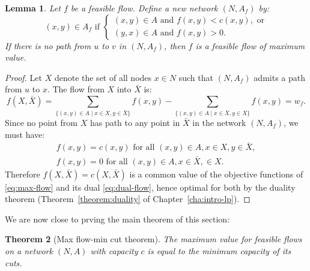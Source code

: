 \documentclass{amsbook}
\newtheorem{theorem}{Theorem}[section]
\newtheorem{lemma}[theorem]{Lemma}
\theoremstyle{definition}
\theoremstyle{remark}
\begin{document}
\begin{lemma}
  \label{lemma:augmentation}
  Let $f$ be a feasible flow.
  Define a new network $(N,A_f)$ by:
  \begin{displaymath}
    (x,y) \in A_f \text{ if }
    \begin{cases}
      (x,y)\in A \text{ and } f(x,y)<c(x,y), \text{ or}\\
      (y,x)\in A \text{ and } f(x,y)>0.
    \end{cases}
  \end{displaymath}
  If there is no path from $u$ to $v$ in $(N,A_f)$, then $f$ is a feasible flow of maximum value.
\end{lemma}
\begin{proof}
  Let $X$ denote the set of all nodes $x\in N$ such that $(N,A_f)$ admits a path from $u$ to $x$.
  The flow from $X$ into $\bar X$ is:
  \begin{displaymath}
    f(X,\bar X) = \sum_{\{(x,y)\in A\mid x\in X,y\in \bar X\}} f(x,y)-\sum_{\{(x,y)\in A\mid x\in \bar X,y\in X\}} f(x,y) = w_f.
  \end{displaymath}
  Since no point from $X$ has path to any point in $\bar X$ in the network $(N,A_f)$, we must have:
  \begin{gather*}
    f(x,y) = c(x,y) \text{ for all } (x,y)\in A, x\in X,y\in \bar X,\\
    f(x,y) = 0 \text{ for all } (x,y)\in A, x\in \bar X,\in X.
  \end{gather*}
  Therefore $f(X,\bar X)=c(X,\bar X)$ is a common value of the objective functions of \eqref{eq:max-flow} and its dual \eqref{eq:dual-flow}, hence optimal for both by the duality theorem (Theorem~\ref{theorem:duality} of Chapter~\ref{cha:intro-lp}).
\end{proof}
We are now close to prving the main theorem of this section:
\begin{theorem}
  [Max flow-min cut theorem]
  \label{theorem:max-flow-min-cut}
  The maximum value for feasible flows on a network $(N,A)$ with capacity $c$ is equal to the minimum capacity of its cuts.
\end{theorem}
\end{document}
